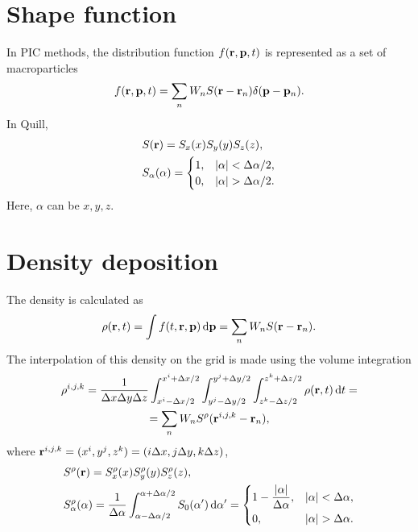 \documentclass[12pt,a4paper,DIV=calc]{scrartcl}
\begin{document}
\section{Shape function}
In PIC methods, the distribution function $f(\vb{r},\vb{p},t)$ is represented as a set of macroparticles
\begin{equation}
    f(\vb{r},\vb{p},t) = \sum_n W_n S(\vb{r} - \vb{r}_n) \delta(\vb{p} - \vb{p}_n).
\end{equation}
In Quill,
\begin{align}
    &S(\vb{r}) = S_x(x) S_y(y) S_z(z),\\
    &S_\alpha(\alpha) = \begin{cases}
        1,&\abs{\alpha} < \Delta \alpha/2,\\
        0,&\abs{\alpha} > \Delta \alpha/2.
    \end{cases}
\end{align}
Here, $\alpha$ can be $x,y,z$.

\section{Density deposition}

The density is calculated as
\begin{equation}
    \rho(\vb{r},t) = \int f(t, \vb{r}, \vb{p}) \dd{\vb{p}} = \sum_n W_n S(\vb{r} - \vb{r}_n).
\end{equation}
The interpolation of this density on the grid is made using the volume integration
\begin{multline}
    \rho^{i,j,k} = \frac{1}{\Delta x \Delta y \Delta z} \int_{x^i-\Delta x/2}^{x^i+\Delta x/2} \int_{y^j-\Delta y/2}^{y^j+\Delta y/2} \int_{z^k-\Delta z/2}^{z^k+\Delta z/2} \rho(\vb{r},t)\dd{t} = \\ 
    =\sum_n W_n S^{\rho}(\vb{r}^{i,j,k} - \vb{r}_n),
\end{multline}
where $\vb{r}^{i,j,k} = (x^i, y^j, z^k) = (i \Delta x, j \Delta y, k \Delta z)$,
\begin{align}
    &S^\rho(\vb{r}) = S_x^\rho(x) S_y^\rho(y) S_z^\rho(z),\\
    &S_\alpha^\rho(\alpha) = \frac{1}{\Delta \alpha} \int_{\alpha-\Delta \alpha/2}^{\alpha + \Delta \alpha/2} S_0(\alpha')\dd{\alpha'} = \begin{dcases}
        1 - \frac{\abs{\alpha}}{\Delta \alpha},& \abs{\alpha} < \Delta\alpha,\\
        0,& \abs{\alpha} > \Delta \alpha.
    \end{dcases}
\end{align}
\end{document}
